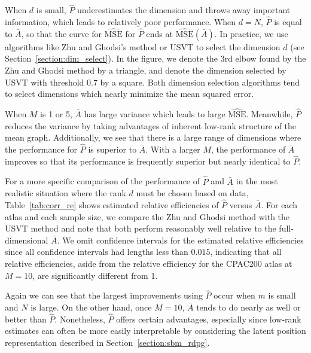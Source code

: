 \documentclass[10pt,letterpaper]{article}
\renewcommand{\hat}{\widehat}
\begin{document}
When $d$ is small, $\hat{P}$ underestimates the dimension and throws away important information, which leads to relatively poor performance. When $d=N$, $\hat{P}$ is equal to $\bar{A}$, so that the curve for $\hat{\mathrm{MSE}}$ for $\hat{P}$ ends at $\hat{\mathrm{MSE}}(\bar{A})$. 
In practice, we use algorithms like Zhu and Ghodsi's method or USVT to select the dimension $d$ (see Section~\ref{section:dim_select}). 
In the figure, we denote the 3rd elbow found by the Zhu and Ghodsi method by a triangle, and denote the dimension selected by USVT with threshold 0.7 by a square. 
Both dimension selection algorithms tend to select dimensions which nearly minimize the mean squared error.

When $M$ is 1 or 5, $\bar{A}$ has large variance which leads to large $\hat{\mathrm{MSE}}$. Meanwhile, $\hat{P}$ reduces the variance by taking advantages of inherent low-rank structure of the mean graph. Additionally, we see that there is a large range of dimensions where the performance for $\hat{P}$ is superior to $\bar{A}$. 
With a larger $M$, the performance of $\bar{A}$ improves so that its performance is frequently superior but nearly identical to $\hat{P}$.

For a more specific comparison of the performance of $\hat{P}$ and $\bar{A}$ in the most realistic situation where the rank $d$ must be chosen based on data, Table~\ref{tab:corr_re} shows estimated relative efficiencies of $\hat{P}$ versus $\bar{A}$.
For each atlas and each sample size, we compare the Zhu and Ghodsi method \cite{zhu2006automatic} with the USVT method \cite{chatterjee2015matrix} and note that both perform reasonably well relative to the full-dimensional $\bar{A}$.
We omit confidence intervals for the estimated relative efficiencies since all confidence intervals had lengths less than $0.015$, indicating that all relative efficiencies, aside from the relative efficiency for the CPAC200 atlas at $M=10$, are significantly different from 1.

Again we can see that the largest improvements using $\hat{P}$ occur when $m$ is small and $N$ is large. 
On the other hand, once $M=10$, $\bar{A}$ tends to do nearly as well or better than $\hat{P}$. 
Nonetheless, $\hat{P}$ offers certain advantages, especially since low-rank estimates can often be more easily interpretable by considering the latent position representation described in Section~\ref{section:sbm_rdpg}.
\end{document}
